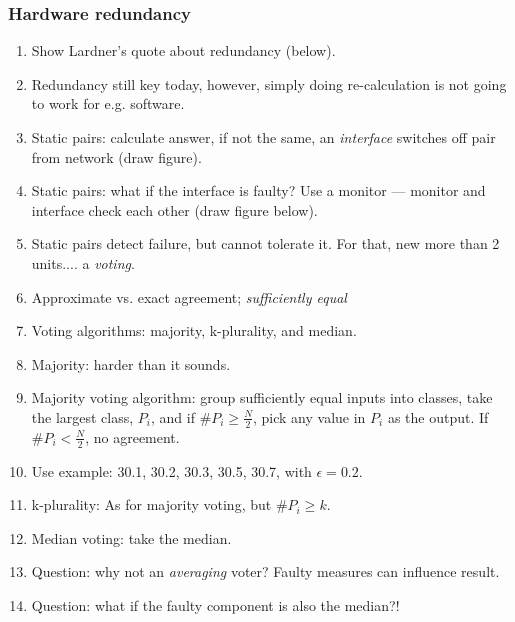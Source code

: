 \documentclass[11pt]{article}
\begin{document}
\subsubsection*{Hardware redundancy}

\begin{enumerate}

 \item Show Lardner's quote about redundancy (below). 

 \item Redundancy still key today, however, simply doing re-calculation is not going to work for e.g. software.

 \item Static pairs: calculate answer, if not the same, an \emph{interface} switches off pair from network (draw figure).

 \item Static pairs: what if the interface is faulty? Use a monitor --- monitor and interface check each other (draw figure below).

 \item Static pairs detect failure, but cannot tolerate it. For that, new more than 2 units.... a \emph{voting}.

 \item Approximate vs. exact agreement; \emph{sufficiently equal}

 \item Voting algorithms: majority, k-plurality, and median.

 \item Majority: harder than it sounds.

 \item Majority voting algorithm: group sufficiently equal inputs into classes, take the largest class, $P_i$, and if $\#P_i \geq \frac{N}{2}$, pick any value in $P_i$ as the output. If $\#P_i < \frac{N}{2}$, no agreement.

 \item Use example: 30.1, 30.2, 30.3, 30.5, 30.7, with $\epsilon = 0.2$.

 \item k-plurality: As for majority voting, but $\#P_i \geq k$.

 \item Median voting: take the median. 

 \item Question: why not an \emph{averaging} voter? Faulty measures can influence result.

 \item Question: what if the faulty component is also the median?!


\end{enumerate}
\end{document}
